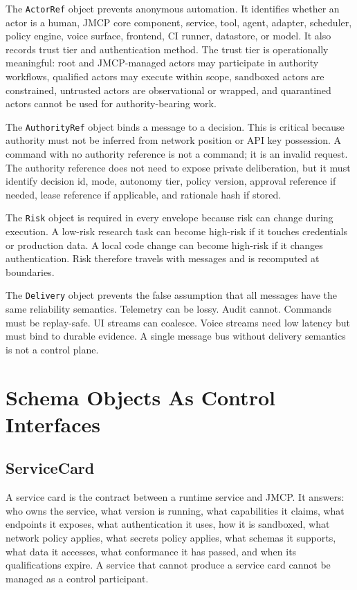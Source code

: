\documentclass[10pt,journal,onecolumn]{IEEEtran}
\begin{document}
The \texttt{ActorRef} object prevents anonymous automation. It identifies whether an actor is a human, JMCP core component, service, tool, agent, adapter, scheduler, policy engine, voice surface, frontend, CI runner, datastore, or model. It also records trust tier and authentication method. The trust tier is operationally meaningful: root and JMCP-managed actors may participate in authority workflows, qualified actors may execute within scope, sandboxed actors are constrained, untrusted actors are observational or wrapped, and quarantined actors cannot be used for authority-bearing work.

The \texttt{AuthorityRef} object binds a message to a decision. This is critical because authority must not be inferred from network position or API key possession. A command with no authority reference is not a command; it is an invalid request. The authority reference does not need to expose private deliberation, but it must identify decision id, mode, autonomy tier, policy version, approval reference if needed, lease reference if applicable, and rationale hash if stored.

The \texttt{Risk} object is required in every envelope because risk can change during execution. A low-risk research task can become high-risk if it touches credentials or production data. A local code change can become high-risk if it changes authentication. Risk therefore travels with messages and is recomputed at boundaries.

The \texttt{Delivery} object prevents the false assumption that all messages have the same reliability semantics. Telemetry can be lossy. Audit cannot. Commands must be replay-safe. UI streams can coalesce. Voice streams need low latency but must bind to durable evidence. A single message bus without delivery semantics is not a control plane.

\section{Schema Objects As Control Interfaces}
\subsection{ServiceCard}
A service card is the contract between a runtime service and JMCP. It answers: who owns the service, what version is running, what capabilities it claims, what endpoints it exposes, what authentication it uses, how it is sandboxed, what network policy applies, what secrets policy applies, what schemas it supports, what data it accesses, what conformance it has passed, and when its qualifications expire. A service that cannot produce a service card cannot be managed as a control participant.
\end{document}
